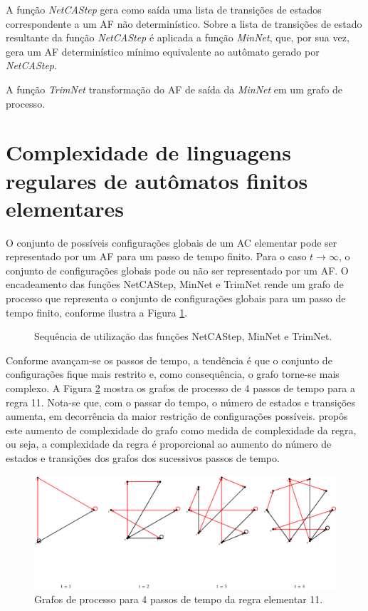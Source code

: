 \documentclass[12pt,a4paper]{article}
\begin{document}
A função \emph{NetCAStep} gera como saída uma lista de transições
de estados correspondente a um AF não determinístico.
Sobre a lista de transições de estado resultante da função
\emph{NetCAStep} é aplicada a função \emph{MinNet}, que, por sua vez,
gera um AF determinístico mínimo equivalente ao autômato gerado por
\emph{NetCAStep}.

A função \emph{TrimNet} transformação do AF de saída da \emph{MinNet}
em um grafo de processo.

\newpage

\section{Complexidade de linguagens regulares de autômatos
finitos elementares}\label{sec:complexity}

O conjunto de possíveis configurações globais de um AC elementar pode ser
representado por um AF para um passo de tempo finito. Para
o caso $t \rightarrow \infty$, o conjunto de configurações globais pode ou
não ser representado por um AF. O encadeamento das funções NetCAStep, MinNet
e TrimNet rende um grafo de processo que representa o conjunto de
configurações globais para um passo de tempo finito, conforme ilustra
a Figura \ref{fig:net}.

\begin{figure}[htp]
\begin{center}

\centerline{\box\graph}
\caption{Sequência de utilização das funções NetCAStep, MinNet e TrimNet.}
\label{fig:net}
\end{center}
\end{figure}

Conforme avançam-se os passos de tempo, a tendência é que o conjunto de 
configurações fique mais restrito e, como consequência, o grafo torne-se
mais complexo. A Figura \ref{fig:r11t} mostra os grafos de processo de
4 passos de tempo para a regra 11. Nota-se que, com o passar do tempo,
o número de estados e transições aumenta, em decorrência da maior
restrição de configurações possíveis.  propôs
este aumento de complexidade do grafo como medida de complexidade da
regra, ou seja, a complexidade da regra é proporcional ao aumento do número
de estados e transições dos grafos dos sucessivos passos de tempo.

\begin{figure}[htp]
\begin{center}
\includegraphics[scale=0.5]{img/Rule11.eps}
\caption{Grafos de processo para 4 passos de tempo da regra elementar 11.}
\label{fig:r11t}
\end{center}
\end{figure}
\end{document}
